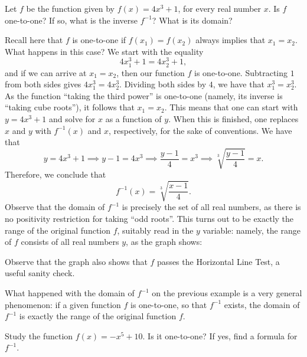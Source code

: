 \documentclass[nooutcomes]{ximera}
\begin{document}
\begin{example}
  Let $f$ be the function given by $f(x) = 4x^3+1$, for every real number $x$. Is $f$ one-to-one? If so, what is the inverse $f^{-1}$? What is its domain?

  \begin{explanation}
    Recall here that $f$ is one-to-one if $f(x_1) = f(x_2)$ always implies that $x_1=x_2$. What happens in this case? We start with the equality $$4x_1^3+1 = 4x_2^3+1,$$ and if we can arrive at $x_1=x_2$, then our function $f$ is one-to-one. Subtracting $1$ from both sides gives $4x_1^3=4x_2^3$. Dividing both sides by $4$, we have that $x_1^3 = x_2^3$. As the function ``taking the third power'' is one-to-one (namely, its inverse is ``taking cube roots''), it follows that $x_1=x_2$. This means that one can start with $y=4x^3+1$ and solve for $x$ as a function of $y$. When this is finished, one replaces $x$ and $y$ with $f^{-1}(x)$ and $x$, respectively, for the sake of conventions. We have that $$y=4x^3+1 \implies y-1 = 4x^3 \implies \frac{y-1}{4} = x^3 \implies \sqrt[3]{\frac{y-1}{4}} = x.$$Therefore, we conclude that $$f^{-1}(x) = \sqrt[3]{\frac{x-1}{4}}.$$Observe that the domain of $f^{-1}$ is precisely the set of all real numbers, as there is no positivity restriction for taking ``odd roots''. This turns out to be exactly the range of the original function $f$, suitably read in the $y$ variable: namely, the range of $f$ consists of all real numbers $y$, as the graph shows:
\begin{image}
\end{image}
Observe that the graph also shows that $f$ passes the Horizontal Line Test, a useful sanity check.
  \end{explanation}
\end{example}

\begin{callout}
  What happened with the domain of $f^{-1}$ on the previous example is a very general phenomenon: if a given function $f$ is one-to-one, so that $f^{-1}$ exists, the domain of $f^{-1}$ is exactly the range of the original function $f$.
\end{callout}

\begin{exploration}
   Study the function $f(x) = -x^5 + 10$. Is it one-to-one? If yes, find a formula for $f^{-1}$.
\end{exploration}
\end{document}
